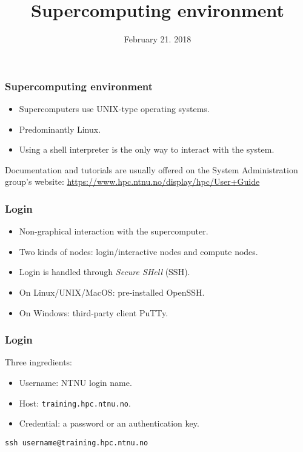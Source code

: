 

\title{Supercomputing environment}
\date{February 21. 2018}

\maketitle

\begin{frame}
  \frametitle{Supercomputing environment}
  \begin{itemize}
  \item Supercomputers use UNIX-type operating systems.
  \item Predominantly Linux.
  \item Using a shell interpreter is the only way to interact with the system.
  \end{itemize}

\bigskip
Documentation and tutorials are usually offered on the System Administration group's website: \url{https://www.hpc.ntnu.no/display/hpc/User+Guide}
\end{frame}

\begin{frame}
  \frametitle{Login}
  \begin{itemize}
  \item Non-graphical interaction with the supercomputer.
  \item Two kinds of nodes: login/interactive nodes and compute nodes.
  \item Login is handled through \emph{Secure SHell} (SSH).
  \item On Linux/UNIX/MacOS: pre-installed OpenSSH.
  \item On Windows: third-party client PuTTy.
  \end{itemize}
\end{frame}

\begin{frame}[fragile]
  \frametitle{Login}

Three ingredients:
  \begin{itemize}
  \item Username: NTNU login name.
  \item Host: \texttt{training.hpc.ntnu.no}.
  \item Credential: a password or an authentication key.
  \end{itemize}

\bigskip
\begin{lstlisting}[style=shell]
ssh username@training.hpc.ntnu.no
\end{lstlisting}

\end{frame}

